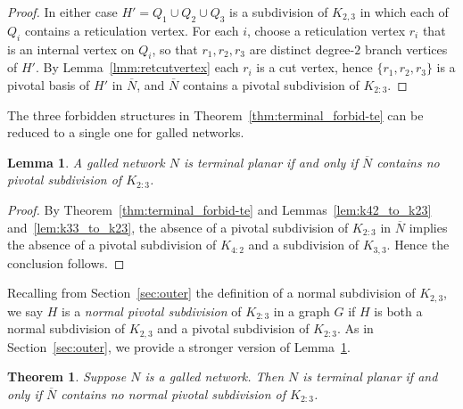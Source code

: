 \documentclass[pdflatex,sn-mathphys-num]{sn-jnl}
\theoremstyle{thmstyleone}%
\newtheorem{theorem}{Theorem}%
\theoremstyle{thmstyletwo}%
\newtheorem{lemma}{Lemma}
\theoremstyle{thmstylethree}%
\begin{document}
\begin{proof}
\smallskip
In either case $H'=Q_1\cup Q_2\cup Q_3$ is a subdivision of $K_{2,3}$ in which each of $Q_i$ contains a reticulation vertex. For each $i$, choose a reticulation vertex $r_i$ that is an internal vertex on $Q_i$, so that $r_1,r_2,r_3$ are distinct degree-$2$ branch vertices of $H'$. By Lemma~\ref{lmm:retcutvertex} each $r_i$ is a cut vertex, hence
$\{r_1,r_2,r_3\}$ is a pivotal basis of $H'$ in $\overline{N}$, and $\overline{N}$ contains a pivotal subdivision of $K_{2:3}$.
\end{proof}





The three forbidden structures in Theorem~\ref{thm:terminal_forbid-te} can be reduced to a single one for galled networks.

\begin{lemma}\label{lem:no_s2}
A galled network $N$ is terminal planar if and only if $\overline{N}$ contains no pivotal subdivision of ${K}_{2:3}$.

\end{lemma}
\begin{proof}
By Theorem~\ref{thm:terminal_forbid-te} and Lemmas~\ref{lem:k42_to_k23} and~\ref{lem:k33_to_k23}, the absence of a  pivotal subdivision of $K_{2:3}$ in $\overline{N}$ implies the absence of a pivotal subdivision of $K_{4:2}$ and a subdivision of $K_{3,3}$. Hence the conclusion follows.
\end{proof}













Recalling from Section~\ref{sec:outer} the definition of a normal subdivision of $K_{2,3}$, we say $H$ is a \emph{normal pivotal subdivision} of $K_{2:3}$ in a graph $G$ if $H$ is both a normal subdivision of $K_{2,3}$ and a pivotal subdivision of $K_{2:3}$. As in Section~\ref{sec:outer}, we provide a stronger version of Lemma~\ref{lem:no_s2}.



\begin{theorem}\label{thm:normal-Kk23}
Suppose $N$ is a galled network. Then $N$ is terminal planar if and only if $\overline{N}$ contains no normal pivotal subdivision of $K_{2:3}$.
\end{theorem}
\end{document}
